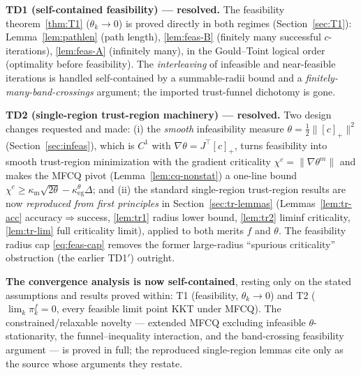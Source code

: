 \documentclass[11pt]{article}
\theoremstyle{definition}
\theoremstyle{plain}
\begin{document}
\textbf{TD1 (self-contained feasibility) --- resolved.} The feasibility
theorem~\ref{thm:T1} ($\theta_k\to0$) is proved directly in both regimes
(Section~\ref{sec:T1}): Lemma~\ref{lem:pathlen} (path length), \ref{lem:feas-B}
(finitely many successful $c$-iterations), \ref{lem:feas-A} (infinitely many), in the
Gould--Toint logical order (optimality before feasibility). The \emph{interleaving}
of infeasible and near-feasible iterations is handled self-contained by a
summable-radii bound and a \emph{finitely-many-band-crossings} argument; the imported
trust-funnel dichotomy is gone.

\textbf{TD2 (single-region trust-region machinery) --- resolved.} Two design changes
requested and made: (i) the \emph{smooth} infeasibility measure
$\theta=\tfrac12\|[c]_+\|^2$ (Section~\ref{sec:infeas}), which is $C^1$ with
$\nabla\theta=J^\top[c]_+$, turns feasibility into smooth trust-region minimization
with the gradient criticality $\chi^c=\|\nabla\theta^m\|$ and makes the MFCQ pivot
(Lemma~\ref{lem:cq-nonstat}) a one-line bound
$\chi^c\ge\kappa_{\mathrm m}\sqrt{2\theta}-\kappa_{\mathrm{eg}}^\theta\Delta$; and (ii)
the standard single-region trust-region results are now \emph{reproduced from first
principles} in Section~\ref{sec:tr-lemmas} (Lemmas~\ref{lem:tr-acc}
accuracy$\Rightarrow$success, \ref{lem:tr1} radius lower bound, \ref{lem:tr2} liminf
criticality, \ref{lem:tr-lim} full criticality limit), applied to both merits $f$ and
$\theta$. The feasibility radius cap \eqref{eq:feas-cap} removes the former
large-radius ``spurious criticality'' obstruction (the earlier TD1$'$) outright.

\noindent\textbf{The convergence analysis is now self-contained}, resting only on the
stated assumptions and results proved within: T1 (feasibility, $\theta_k\to0$) and T2
($\lim_k\pi_k^f=0$, every feasible limit point KKT under MFCQ). The
constrained/relaxable novelty --- extended MFCQ excluding infeasible
$\theta$-stationarity, the funnel--inequality interaction, and the band-crossing
feasibility argument --- is proved in full; the reproduced single-region lemmas cite
\citet[Ch.~6.4]{ConnGouldToint2000} only as the source whose arguments they restate.





\end{document}
